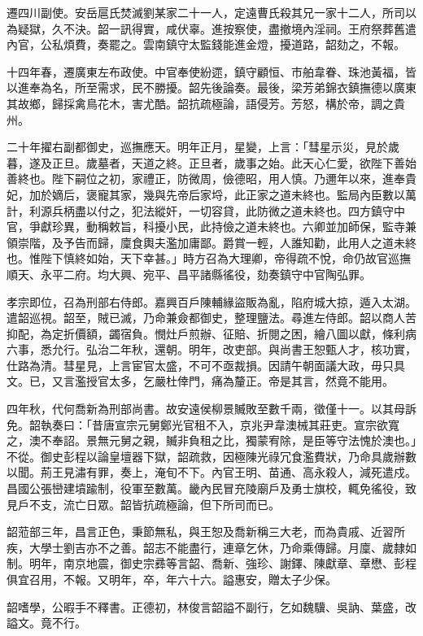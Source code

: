 \begin{pinyinscope}
遷四川副使。安岳扈氏焚滅劉某家二十一人，定遠曹氏殺其兄一家十二人，所司以為疑獄，久不決。韶一訊得實，咸伏辜。進按察使，盡撤境內淫祠。王府祭葬舊遣內官，公私煩費，奏罷之。雲南鎮守太監錢能進金燈，擾道路，韶劾之，不報。

十四年春，遷廣東左布政使。中官奉使紛遝，鎮守顧恒、市舶韋眷、珠池黃福，皆以進奉為名，所至需求，民不勝擾。韶先後論奏。最後，梁芳弟錦衣鎮撫德以廣東其故鄉，歸採禽鳥花木，害尤酷。韶抗疏極論，語侵芳。芳怒，構於帝，調之貴州。

二十年擢右副都御史，巡撫應天。明年正月，星變，上言：「彗星示災，見於歲暮，遂及正旦。歲墓者，天道之終。正旦者，歲事之始。此天心仁愛，欲陛下善始善終也。陛下嗣位之初，家禮正，防微周，儉德昭，用人慎。乃邇年以來，進奉貴妃，加於嫡后，褒寵其家，幾與先帝后家埒，此正家之道未終也。監局內臣數以萬計，利源兵柄盡以付之，犯法縱奸，一切容貸，此防微之道未終也。四方鎮守中官，爭獻珍異，動稱敕旨，科擾小民，此持儉之道未終也。六卿並加師保，監寺兼領崇階，及予告而歸，廩食輿夫濫加庸鄙。爵賞一輕，人誰知勸，此用人之道未終也。惟陛下慎終如始，天下幸甚。」時方召為大理卿，帝得疏不悅，命仍故官巡撫順天、永平二府。均大興、宛平、昌平諸縣徭役，劾奏鎮守中官陶弘罪。

孝宗即位，召為刑部右侍郎。嘉興百戶陳輔緣盜販為亂，陷府城大掠，遁入太湖。遣韶巡視。韶至，賊已滅，乃命兼僉都御史，整理鹽法。尋進左侍郎。韶以商人苦抑配，為定折價額，蠲宿負。憫灶戶煎辦、征賠、折閱之困，繪八圖以獻，條利病六事，悉允行。弘治二年秋，還朝。明年，改吏部。與尚書王恕甄人才，核功實，仕路為清。彗星見，上言宦官太盛，不可不亟裁損。因請午朝面議大政，毋只具文。已，又言濫授官太多，乞嚴杜倖門，痛為釐正。帝是其言，然竟不能用。

四年秋，代何喬新為刑部尚書。故安遠侯柳景贓敗至數千兩，徵僅十一。以其母訴免。韶執奏曰：「昔唐宣宗元舅鄭光官租不入，京兆尹韋澳械其莊吏。宣宗欲寬之，澳不奉詔。景無元舅之親，贓非負租之比，獨蒙宥除，是臣等守法愧於澳也。」不從。御史彭程以論皇壇器下獄，韶疏救，因極陳光祿冗食濫費狀，乃命具歲辦數以聞。荊王見潚有罪，奏上，淹旬不下。內官王明、苗通、高永殺人，減死遣戍。昌國公張巒建墳踰制，役軍至數萬。畿內民冒充陵廟戶及勇士旗校，輒免徭役，致見戶不支，流亡日眾。韶皆抗疏極論，但下所司而已。

韶蒞部三年，昌言正色，秉節無私，與王恕及喬新稱三大老，而為貴戚、近習所疾，大學士劉吉亦不之善。韶志不能盡行，連章乞休，乃命乘傳歸。月廩、歲隸如制。明年，南京地震，御史宗彞等言韶、喬新、強珍、謝鐸、陳獻章、章懋、彭程俱宜召用，不報。又明年，卒，年六十六。謚惠安，贈太子少保。

韶嗜學，公暇手不釋書。正德初，林俊言韶謚不副行，乞如魏驥、吳訥、葉盛，改謚文。竟不行。


\end{pinyinscope}
